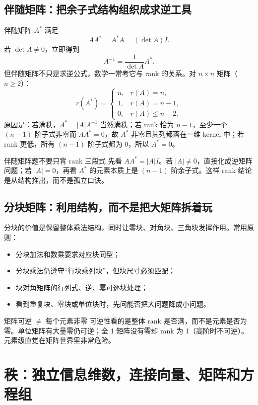 \documentclass[11pt,a4paper,openany]{ctexbook}
\begin{document}
\section{伴随矩阵：把余子式结构组织成求逆工具}
伴随矩阵 $A^*$ 满足
\[
AA^*=A^*A=(\det A)I.
\]
若 $\det A\neq0$，立即得到
\[
A^{-1}=\frac{1}{\det A}A^*.
\]
但伴随矩阵不只是求逆公式，数学一常考它与 rank 的关系。对 $n\times n$ 矩阵（$n\ge2$）：
\[
r(A^*)=
\begin{cases}
 n,&r(A)=n,\\
 1,&r(A)=n-1,\\
 0,&r(A)\le n-2.
\end{cases}
\]
原因是：若满秩，$A^*=|A|A^{-1}$ 当然满秩；若 rank 恰为 $n-1$，至少一个 $(n-1)$ 阶子式非零而 $AA^*=0$，故 $A^*$ 非零且其列都落在一维 kernel 中；若 rank 更低，所有 $(n-1)$ 阶子式都为 0，所以 $A^*=0$。

\begin{examBox}{伴随矩阵题不要只背 rank 三段式}
先看 $AA^*=|A|I$。若 $|A|\neq0$，直接化成逆矩阵问题；若 $|A|=0$，再看 $A^*$ 的元素本质上是 $(n-1)$ 阶余子式。这样 rank 结论是从结构推出，而不是孤立口诀。
\end{examBox}

\section{分块矩阵：利用结构，而不是把大矩阵拆着玩}
分块的价值是保留整体乘法结构，同时让零块、对角块、三角块发挥作用。常用原则：
\begin{itemize}
  \item 分块加法和数乘要求对应块同型；
  \item 分块乘法仍遵守“行块乘列块”，但块尺寸必须匹配；
  \item 块对角矩阵的行列式、逆、幂可逐块处理；
  \item 看到重复块、零块或单位块时，先问能否把大问题降成小问题。
\end{itemize}

\begin{boundarybox}{矩阵可逆 $\neq$ 每个元素非零}
可逆性看的是整体 rank 是否满，而不是元素是否为零。单位矩阵有大量零仍可逆；全 1 矩阵没有零却 rank 为 1（高阶时不可逆）。元素级直觉在矩阵世界里非常危险。
\end{boundarybox}

\chapter{秩：独立信息维数，连接向量、矩阵和方程组}
\end{document}

